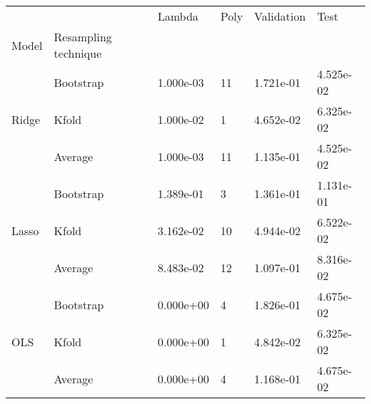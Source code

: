 \begin{tabular}{llllll}
\toprule
    &         &    Lambda & Poly & Validation &      Test \\
Model & Resampling technique &           &      &            &           \\
\midrule
\multirow{3}{*}{Ridge} & Bootstrap & 1.000e-03 &   11 &  1.721e-01 & 4.525e-02 \\
    & Kfold & 1.000e-02 &    1 &  4.652e-02 & 6.325e-02 \\
    & Average & 1.000e-03 &   11 &  1.135e-01 & 4.525e-02 \\
\cline{1-6}
\multirow{3}{*}{Lasso} & Bootstrap & 1.389e-01 &    3 &  1.361e-01 & 1.131e-01 \\
    & Kfold & 3.162e-02 &   10 &  4.944e-02 & 6.522e-02 \\
    & Average & 8.483e-02 &   12 &  1.097e-01 & 8.316e-02 \\
\cline{1-6}
\multirow{3}{*}{OLS} & Bootstrap & 0.000e+00 &    4 &  1.826e-01 & 4.675e-02 \\
    & Kfold & 0.000e+00 &    1 &  4.842e-02 & 6.325e-02 \\
    & Average & 0.000e+00 &    4 &  1.168e-01 & 4.675e-02 \\
\bottomrule
\end{tabular}
